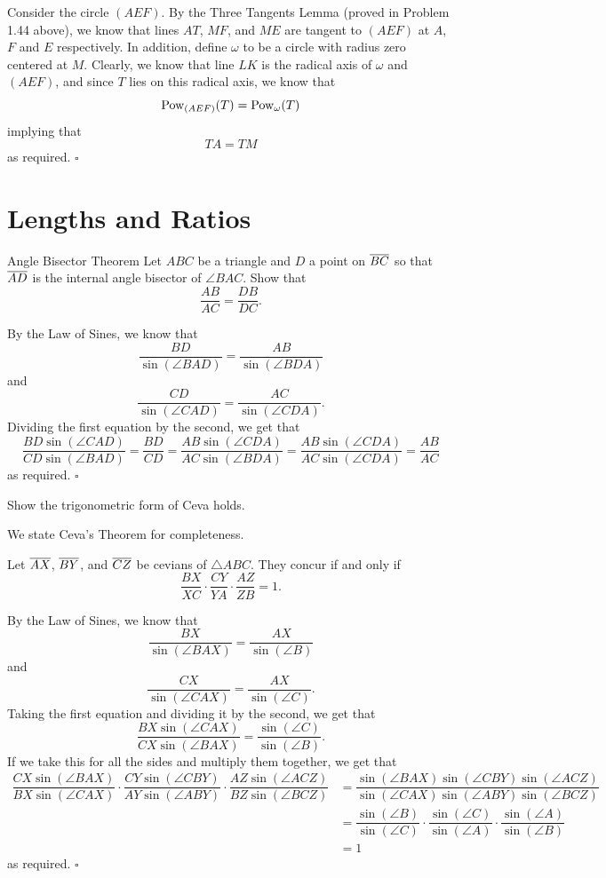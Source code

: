 \documentclass{article}
\begin{document}
Consider the circle $(AEF)$. By the Three Tangents Lemma (proved in Problem 1.44 above), we know that lines $AT$, $MF$, and $ME$ are tangent to $(AEF)$ at $A$, $F$ and $E$ respectively. In addition, define $\omega$ to be a circle with radius zero centered at $M$. Clearly, we know that line $LK$ is the radical axis of $\omega$ and $(AEF)$, and since $T$ lies on this radical axis, we know that \[\text{Pow}_{(AEF)}(T) = \text{Pow}_{\omega}(T)\] implying that \[TA = TM\] as required. $\square$

\newpage

\section{Lengths and Ratios}

\begin{problem}[3.2]{Angle Bisector Theorem}
Let $ABC$ be a triangle and $D$ a point on $\overline{BC}$ so that $\overline{AD}$ is the internal angle bisector of $\angle BAC$. Show that \[\dfrac{AB}{AC} = \dfrac{DB}{DC}.\]
\end{problem}

By the Law of Sines, we know that \[\dfrac{BD}{\sin(\angle BAD)} = \dfrac{AB}{\sin(\angle BDA)}\] and \[\dfrac{CD}{\sin(\angle CAD)} = \dfrac{AC}{\sin(\angle CDA)}.\] Dividing the first equation by the second, we get that \[\dfrac{BD\sin(\angle CAD)}{CD\sin(\angle BAD)}=\dfrac{BD}{CD} = \dfrac{AB\sin(\angle CDA)}{AC\sin(\angle BDA)} = \dfrac{AB\sin(\angle CDA)}{AC\sin(\angle CDA)} = \dfrac{AB}{AC}\] as required. $\square$

\begin{problem}[3.5]{}
Show the trigonometric form of Ceva holds.
\end{problem}
We state Ceva's Theorem for completeness.
\begin{theorem*}
Let $\overline{AX}$, $\overline{BY}$, and $\overline{CZ}$ be cevians of $\triangle ABC$. They concur if and only if \[\dfrac{BX}{XC}\cdot\dfrac{CY}{YA}\cdot\dfrac{AZ}{ZB} = 1.\]
\end{theorem*}
By the Law of Sines, we know that \[\dfrac{BX}{\sin(\angle BAX)} = \dfrac{AX}{\sin(\angle B)}\] and \[\dfrac{CX}{\sin(\angle CAX)} = \dfrac{AX}{\sin(\angle C)}.\] Taking the first equation and dividing it by the second, we get that \[\dfrac{BX\sin(\angle CAX)}{CX\sin(\angle BAX)} = \dfrac{\sin(\angle C)}{\sin(\angle B)}.\] If we take this for all the sides and multiply them together, we get that 
\begin{align*}
\dfrac{CX\sin(\angle BAX)}{BX\sin(\angle CAX)}\cdot\dfrac{CY\sin(\angle CBY)}{AY\sin(\angle ABY)}\cdot\dfrac{AZ\sin(\angle ACZ)}{BZ\sin(\angle BCZ)} &= \dfrac{\sin(\angle BAX)\sin(\angle CBY)\sin(\angle ACZ)}{\sin(\angle CAX)\sin(\angle ABY)\sin(\angle BCZ)} \\
&=  \dfrac{\sin(\angle B)}{\sin(\angle C)}\cdot \dfrac{\sin(\angle C)}{\sin(\angle A)}\cdot\dfrac{\sin(\angle A)}{\sin(\angle B)} \\
&= 1
\end{align*}
as required. $\square$
\end{document}
